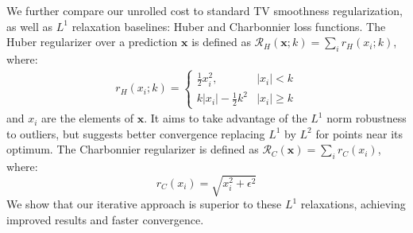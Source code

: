 \documentclass[10pt,twocolumn,letterpaper]{article}
\begin{document}
We further compare our unrolled cost to standard TV smoothness regularization, as well as $L^1$ relaxation baselines: Huber \cite{huber1964robust} and Charbonnier \cite{charbonnier1997deterministic} loss functions.
The Huber regularizer over a prediction $\mathbf{x}$ is defined as $\mathcal{R}_H(\mathbf{x};k)=\sum_i r_H (x_i;k)$, where:
\begin{equation} \label{eq:huber}
\begin{aligned}
    r_H(x_i;k) =
    \begin{cases}
    \frac{1}{2}x_i^2, & |x_i| < k \\
    k|x_i| -\frac{1}{2}k^2 & |x_i| \geq k
    \end{cases}
\end{aligned}
\end{equation}
and $x_i$ are the elements of $\mathbf{x}$. It aims to take advantage of the $L^1$ norm robustness to outliers, but suggests better convergence replacing $L^1$ by $L^2$ for points near its optimum. The Charbonnier regularizer is defined as $\mathcal{R}_C(\mathbf{x})=\sum_i r_C(x_i)$, where:
\begin{equation} \label{eq:charb}
    r_C(x_i)=\sqrt{x_i^2+\epsilon^2}
\end{equation}
We show that our iterative approach is superior to these $L^1$ relaxations, achieving improved results and faster convergence.
\end{document}
